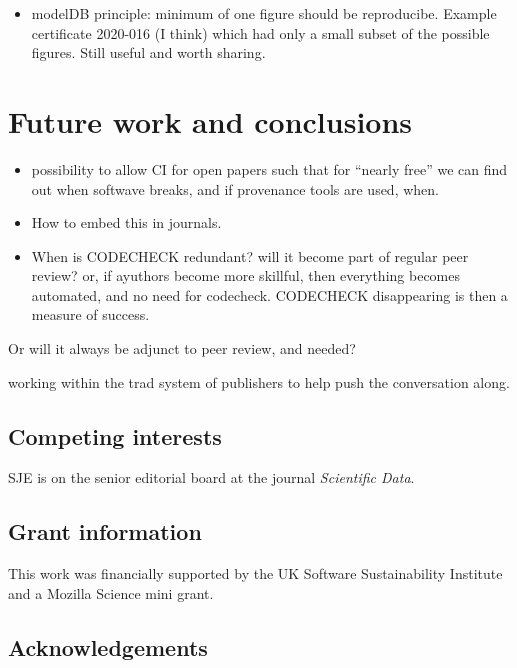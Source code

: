 \documentclass[12pt]{article}
\begin{document}
\begin{itemize}
\item modelDB principle: minimum of one figure should be reproducibe.
  Example certificate 2020-016 (I think) which had only a small subset
  of the possible figures. Still useful and worth sharing.
\end{itemize}

\section*{Future work and conclusions}\label{future-work-and-conclusions}

\begin{itemize}
\item
  possibility to allow CI for open papers such that for ``nearly free''
  we can find out when softwave breaks, and if provenance tools are
  used, when.
\item
  How to embed this in journals.
\item
  When is CODECHECK redundant? will it become part of regular peer
  review? or, if ayuthors become more skillful, then everything becomes
  automated, and no need for codecheck. CODECHECK disappearing is then a
  measure of success.
\end{itemize}

Or will it always be adjunct to peer review, and needed?

working within the trad system of publishers to help push the
conversation along.




\subsection*{Competing interests}

SJE is on the senior editorial board at the journal \emph{Scientific
Data}.

\subsection*{Grant information}

This work was financially supported by the UK Software
Sustainability Institute and a Mozilla Science mini grant.

\subsection*{Acknowledgements}\label{acknowledgements}
\end{document}
